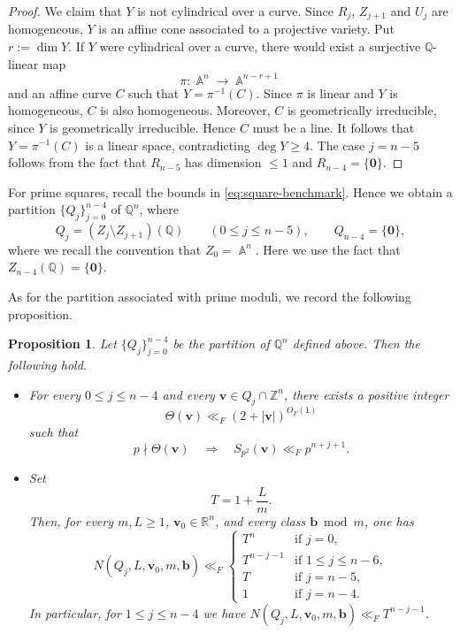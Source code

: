 \documentclass[a4paper,11pt, twoside,reqno]{amsart}
\theoremstyle{plain}
\newtheorem{prop}[thm]{Proposition}
\theoremstyle{definition}
\theoremstyle{remark}
\newcommand{\bfb}{\bm{b}}
\newcommand{\bfv}{\bm{v}}
\newcommand{\ZZ}{\mathbb{Z}}
\newcommand{\RR}{\mathbb{R}}
\newcommand{\QQ}{\mathbb{Q}}
\DeclareMathOperator{\A}{\mathbb{A}}
\renewcommand{\le}{\leqslant}
\renewcommand{\leq}{\leqslant}
\renewcommand{\geq}{\geqslant}
\numberwithin{equation}{section}
\begin{document}
\begin{proof}
We claim that $Y$ is not cylindrical over a curve. Since
$R_j$, $Z_{j+1}$ and $U_j$ are homogeneous, $Y$ is an affine
cone associated to a projective variety. Put $r:=\dim Y$.
If $Y$ were cylindrical over a curve, there would exist a
surjective $\QQ$-linear map
\[
\pi:\A^n\longrightarrow\A^{n-r+1}
\]
and an affine curve $C$ such that $Y=\pi^{-1}(C)$.
Since $\pi$ is linear and $Y$ is homogeneous, $C$ is also
homogeneous. Moreover, $C$ is geometrically irreducible,
since $Y$ is geometrically irreducible. Hence $C$ must be
a line. It follows that $Y=\pi^{-1}(C)$ is a linear space,
contradicting $\deg Y\geq4$.
The case $j=n-5$ follows from the fact that $R_{n-5}$ has dimension $\leq 1$ and $R_{n-4}=\{\mathbf 0\}$.
\end{proof}

For prime squares, recall the bounds in \eqref{eq:square-benchmark}.
Hence we obtain a partition $\{Q_j\}_{j=0}^{n-4}$ of $\QQ^n$,
where
\[
Q_j=(Z_j\setminus Z_{j+1})(\QQ)
\qquad (0\leq j\leq n-5),
\qquad
Q_{n-4}=\{\bm0\},
\]
where we recall the convention that $Z_0=\A^n$. Here we use the fact that $Z_{n-4}(\QQ)=\{\bm0\}$.

As for the partition associated with prime moduli, we record
the following proposition.
\begin{prop}
\label{PROP:partition-Qj}
Let $\{Q_j\}_{j=0}^{n-4}$ be the partition of $\QQ^n$
defined above. Then the following hold.
\begin{itemize}
\item[$i)$]
For every $0\leq j\leq n-4$ and every
$\bfv\in Q_j\cap\ZZ^n$, there exists a positive integer
\[
\Theta(\bfv)\ll_F(2+|\bfv|)^{O_F(1)}
\]
such that
\[
p\nmid\Theta(\bfv)
\quad\Longrightarrow\quad
S_{p^2}(\bfv)\ll_F p^{n+j+1}.
\]

\item[$ii)$]
Set 
\[
T=1+\frac{L}{m}.
\]
Then, for every $m,L\geq 1$, 
$\bfv_0\in\RR^n$, and every class $\bfb\bmod m$, one has
\begin{equation}\label{n10:Q-progression-counts_square}
N(Q_j,L,\bfv_0,m,\bfb)
\ll_F
\begin{cases}
T^n
&\text{if $j=0$},\\
T^{n-j-1}
&\text{if $1\leq j\leq n-6$},\\
T
&\text{if $j=n-5$},\\
1
&\text{if $j=n-4$}.
\end{cases}
\end{equation}
In particular, for $1\le j\le n-4$ we have $N(Q_j,L,\bfv_0,m,\bfb)
\ll_F T^{n-j-1}$.
\end{itemize}
\end{prop}
\end{document}
